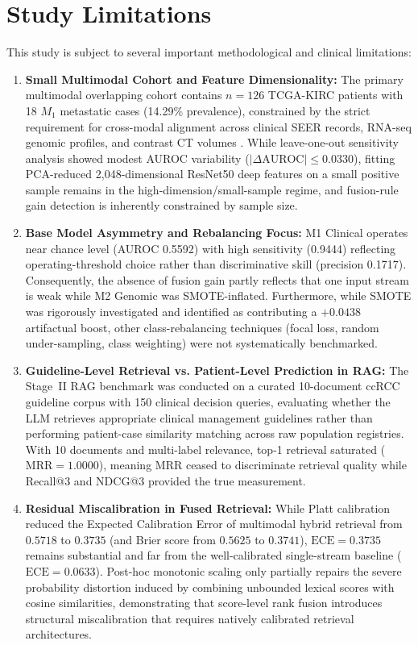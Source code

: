 \section{Study Limitations}
\label{sec:limitations}

This study is subject to several important methodological and clinical limitations:
\begin{enumerate}
    \item \textbf{Small Multimodal Cohort and Feature Dimensionality:} The primary multimodal overlapping cohort contains $n = 126$ TCGA-KIRC patients with 18 $M_1$ metastatic cases (14.29\% prevalence), constrained by the strict requirement for cross-modal alignment across clinical SEER records, RNA-seq genomic profiles, and contrast CT volumes \cite{schulz2021multimodal, mota2024multimodal}. While leave-one-out sensitivity analysis showed modest AUROC variability ($|\Delta \text{AUROC}| \le 0.0330$), fitting PCA-reduced 2,048-dimensional ResNet50 deep features on a small positive sample remains in the high-dimension/small-sample regime, and fusion-rule gain detection is inherently constrained by sample size.
    \item \textbf{Base Model Asymmetry and Rebalancing Focus:} M1 Clinical operates near chance level (AUROC 0.5592) with high sensitivity (0.9444) reflecting operating-threshold choice rather than discriminative skill (precision 0.1717). Consequently, the absence of fusion gain partly reflects that one input stream is weak while M2 Genomic was SMOTE-inflated. Furthermore, while SMOTE was rigorously investigated and identified as contributing a $+0.0438$ artifactual boost, other class-rebalancing techniques (focal loss, random under-sampling, class weighting) were not systematically benchmarked.
    \item \textbf{Guideline-Level Retrieval vs. Patient-Level Prediction in RAG:} The Stage~II RAG benchmark was conducted on a curated 10-document ccRCC guideline corpus with 150 clinical decision queries, evaluating whether the LLM retrieves appropriate clinical management guidelines rather than performing patient-case similarity matching across raw population registries. With 10 documents and multi-label relevance, top-1 retrieval saturated ($\text{MRR} = 1.0000$), meaning MRR ceased to discriminate retrieval quality while Recall@3 and NDCG@3 provided the true measurement.
    \item \textbf{Residual Miscalibration in Fused Retrieval:} While Platt calibration reduced the Expected Calibration Error of multimodal hybrid retrieval from $0.5718$ to $0.3735$ (and Brier score from $0.5625$ to $0.3741$), $\text{ECE} = 0.3735$ remains substantial and far from the well-calibrated single-stream baseline ($\text{ECE} = 0.0633$). Post-hoc monotonic scaling only partially repairs the severe probability distortion induced by combining unbounded lexical scores with cosine similarities, demonstrating that score-level rank fusion introduces structural miscalibration that requires natively calibrated retrieval architectures.

\end{enumerate}
